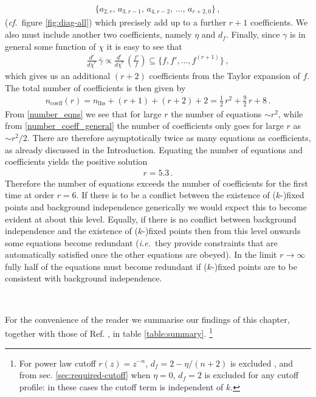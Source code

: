 \documentclass[11pt]{book}
\newcommand\ie{\textit{i.e.}\ }
\newcommand\cf{\textit{cf.}\ }
\numberwithin{equation}{chapter}
\begin{document}
\begin{align}
  \bigg\lbrace
  a_{2,r},\, a_{3,r-1},\, a_{4,r-2},\, \dots,\, a_{r+2,0}
  \bigg\rbrace \,,
\end{align}
(\cf figure \ref{fig:diag-all}) which precisely add up to a further $r+1$ coefficients.
We also must include another two coefficients, namely $\eta$ and $d_f$.
Finally, since $\gamma$ is in general some function of $\chi$ it is easy to see that
\begin{align}
  \frac{d^r}{d \bar\chi^r} \, \bar{\gamma} \propto \frac{d^r}{d \bar\chi^r} \, \left( \frac{f'}{f}\right) \subseteq
  \bigg\lbrace f, f', \dots, f^{(r+1)}   \bigg\rbrace \,,
\end{align}
which gives us an additional $(r+2)$ coefficients from the Taylor expansion of $f$.
The total number of coefficients is then given by
\begin{align}
  \label{number_coeff_general}
  n_{\text{coeff}}(r) = n_{\text{lhs}} + (r+1) + (r+2) + 2  = \frac{1}{2} \, r^2 + \frac{9}{2} \, r + 8 \,.
\end{align}
From \eqref{number_eqns} we see that for large $r$ the number of equations $\sim r^2$,
while from \eqref{number_coeff_general} the number of coefficients only goes for large $r$ as $\sim r^2/2$.
There are therefore asymptotically twice as many equations as coefficients,
as already discussed in the Introduction.
Equating the number of equations and coefficients yields the positive solution
\begin{align}
  r = 5.3 \,.
\end{align}
Therefore the number of equations exceeds the number of coefficients for the first time at order $r=6$.
If there is to be a conflict between the existence of ($k$-)fixed points and background independence
generically we would expect this to become evident at about this level.
Equally, if there is no conflict between background independence and the existence of ($k$-)fixed points
then from this level onwards some equations become redundant
(\ie they provide constraints that are automatically satisfied once the other equations are obeyed).
In the limit $r\to\infty$ fully half of the equations must become redundant if ($k$-)fixed points are
to be consistent with background independence.

~

For the convenience of the reader we summarise our findings of this chapter,
together with those of Ref. \cite{Dietz:2015owa}, in table \ref{table:summary}.%
\footnote{
  For power law cutoff  $r(z)=z^{-n}$, $d_f = 2-\eta/(n+2)$ is excluded \cite{Dietz:2015owa},
  and from sec. \ref{sec:required-cutoff} when $\eta=0$,  $d_f=2$ is excluded for any cutoff profile:
  in these cases the cutoff term is independent of $k$.
}
\end{document}
